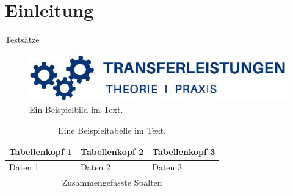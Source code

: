 \section{Einleitung}
Testsätze 
\cite{Dum:Bei}

\begin{figure}[h]
    \centering
    \includegraphics[width=\textwidth]{image/transferleistung.jpg}
    \caption{Ein Beispielbild im Text.}
    \label{fig:tl-logo}
\end{figure}

\begin{table}[h]
    \centering
    \begin{tabular}{|p{}|p{}|p{}|}
        \hline
        Tabellenkopf 1 & Tabellenkopf 2 & Tabellenkopf 3 \\\hline\hline
        Daten 1 & Daten 2 & Daten 3 \\\hline
        \multicolumn{3}{|c|}{Zusammengefasste Spalten} \\\hline
    \end{tabular}
    \caption{Eine Beispieltabelle im Text.}
    \label{tab:example}
\end{table}